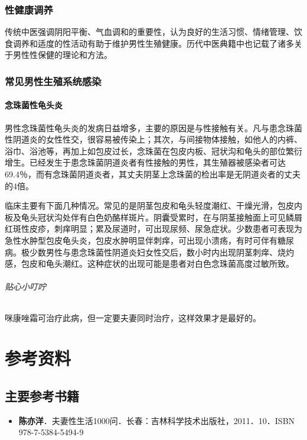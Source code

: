 \subsection{性健康调养}

传统中医强调阴阳平衡、气血调和的重要性，认为良好的生活习惯、情绪管理、饮食调养和适度的性活动有助于维护男性生殖健康。历代中医典籍中也记载了诸多关于男性性保健的理论和方法。

\subsection{常见男性生殖系统感染}

\subsubsection{念珠菌性龟头炎}

男性念珠菌性龟头炎的发病日益增多，主要的原因是与性接触有关。凡与患念珠菌性阴道炎的女性性交，很容易被传染上；其次，与间接物体接触，如他人的内裤、浴巾、浴池等，再加上如包皮过长，念珠菌在包皮内板、冠状沟和龟头的部位繁衍增生。已经发生于患念珠菌阴道炎者有性接触的男性，其生殖器被感染者可达69.4％，而有念珠菌阴道炎者，其丈夫阴茎上念珠菌的检出率是无阴道炎者的丈夫的4倍。

临床主要有下面几种情况。常见的是阴茎包皮和龟头轻度潮红、干燥光滑，包皮内板及龟头冠状沟处伴有白色奶酪样斑片。阴囊受累时，在与阴茎接触面上可见鳞屑红斑性皮疹，刺痒明显；累及尿道时，可出现尿频、尿急症状。少数患者可表现为急性水肿型包皮龟头炎，包皮水肿明显伴刺痒，可出现小溃疡，有时可伴有糖尿病。极少数男性与患念珠菌性阴道炎妇女性交后，数小时内出现阴茎刺痒、烧灼感，包皮和龟头潮红。这种症状的出现可能是患者对白色念珠菌高度过敏所致。

\subparagraph{贴心小叮咛}

咪康唑霜可治疗此病，但一定要夫妻同时治疗，这样效果才是最好的。

\chapter{参考资料}

\section{主要参考书籍}

\begin{itemize}
    \item \textbf{陈亦洋}．夫妻性生活1000问．长春：吉林科学技术出版社，2011．10．ISBN 978-7-5384-5494-9
\end{itemize}

